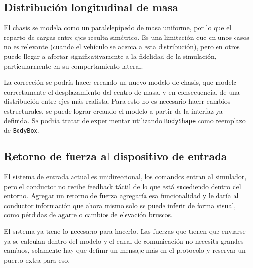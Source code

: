 
\subsection{Distribución longitudinal de masa}

El chasis se modela como un paralelepípedo de masa uniforme, por lo que el reparto de cargas entre ejes resulta simétrico. Es una limitación que en unos casos no es relevante (cuando el vehículo se acerca a esta distribución), pero en otros puede llegar a afectar significativamente a la fidelidad de la simulación, particularmente en su comportamiento lateral.

La corrección se podría hacer creando un nuevo modelo de chasis, que modele correctamente el desplazamiento del centro de masa, y en consecuencia, de una distribución entre ejes más realista. Para esto no es necesario hacer cambios estructurales, se puede lograr creando el modelo a partir de la interfaz ya definida. Se podría tratar de experimentar utilizando \verb|BodyShape| como reemplazo de \verb|BodyBox|.


\subsection{Retorno de fuerza al dispositivo de entrada}

El sistema de entrada actual es unidireccional, los comandos entran al simulador, pero el conductor no recibe feedback táctil de lo que está sucediendo dentro del entorno. Agregar un retorno de fuerza agregaría esa funcionalidad y le daría al conductor información que ahora mismo solo se puede inferir de forma visual, como pérdidas de agarre o cambios de elevación bruscos.

El sistema ya tiene lo necesario para hacerlo. Las fuerzas que tienen que enviarse ya se calculan dentro del modelo y el canal de comunicación no necesita grandes cambios, solamente hay que definir un mensaje más en el protocolo y reservar un puerto extra para eso.



